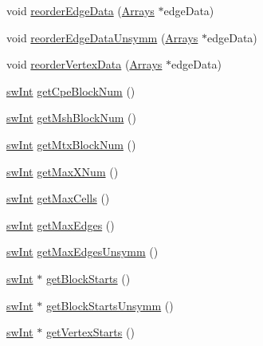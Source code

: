 \begin{DoxyCompactItemize}
\item 
void \hyperlink{classMultiLevelBlockIterator_a6db1df64cc6cb8c7fdc8ad6587f51a87}{reorderEdgeData} (\hyperlink{structArrays}{Arrays} $\ast$edgeData)
\item 
void \hyperlink{classMultiLevelBlockIterator_a96adad6f8220ff77653f75150bbd1b3c}{reorderEdgeDataUnsymm} (\hyperlink{structArrays}{Arrays} $\ast$edgeData)
\item 
void \hyperlink{classMultiLevelBlockIterator_ac442935a4731bb5ae8548bad040ac692}{reorderVertexData} (\hyperlink{structArrays}{Arrays} $\ast$edgeData)
\item 
\hyperlink{swMacro_8h_a113cf5f6b5377cdf3fac6aa4e443e9aa}{swInt} \hyperlink{classMultiLevelBlockIterator_a66bb952127c40b44e45ec853e3ff7af6}{getCpeBlockNum} ()
\item 
\hyperlink{swMacro_8h_a113cf5f6b5377cdf3fac6aa4e443e9aa}{swInt} \hyperlink{classMultiLevelBlockIterator_a6076c2b3469188f4e1399c5c21216419}{getMshBlockNum} ()
\item 
\hyperlink{swMacro_8h_a113cf5f6b5377cdf3fac6aa4e443e9aa}{swInt} \hyperlink{classMultiLevelBlockIterator_a363f06fbb8acd59e7a8211bdc8afe3d5}{getMtxBlockNum} ()
\item 
\hyperlink{swMacro_8h_a113cf5f6b5377cdf3fac6aa4e443e9aa}{swInt} \hyperlink{classMultiLevelBlockIterator_a86ec532cd96ba3e75346f8dfd1011595}{getMaxXNum} ()
\item 
\hyperlink{swMacro_8h_a113cf5f6b5377cdf3fac6aa4e443e9aa}{swInt} \hyperlink{classMultiLevelBlockIterator_a39bd10d2154b5e429e49d9c9a2f82cff}{getMaxCells} ()
\item 
\hyperlink{swMacro_8h_a113cf5f6b5377cdf3fac6aa4e443e9aa}{swInt} \hyperlink{classMultiLevelBlockIterator_a29a4f30de98e453ff26d14d44ca97e65}{getMaxEdges} ()
\item 
\hyperlink{swMacro_8h_a113cf5f6b5377cdf3fac6aa4e443e9aa}{swInt} \hyperlink{classMultiLevelBlockIterator_a0148ef791de73511bb725a3d2f71d49b}{getMaxEdgesUnsymm} ()
\item 
\hyperlink{swMacro_8h_a113cf5f6b5377cdf3fac6aa4e443e9aa}{swInt} $\ast$ \hyperlink{classMultiLevelBlockIterator_afd32075e0f371fbcb5c9a577c11bdb7a}{getBlockStarts} ()
\item 
\hyperlink{swMacro_8h_a113cf5f6b5377cdf3fac6aa4e443e9aa}{swInt} $\ast$ \hyperlink{classMultiLevelBlockIterator_ac7c3935ce8f4a3d6f4634c85b6a2dc39}{getBlockStartsUnsymm} ()
\item 
\hyperlink{swMacro_8h_a113cf5f6b5377cdf3fac6aa4e443e9aa}{swInt} $\ast$ \hyperlink{classMultiLevelBlockIterator_aee947df3eaa77066c7d5fbc23a6e3ca4}{getVertexStarts} ()
\end{DoxyCompactItemize}
